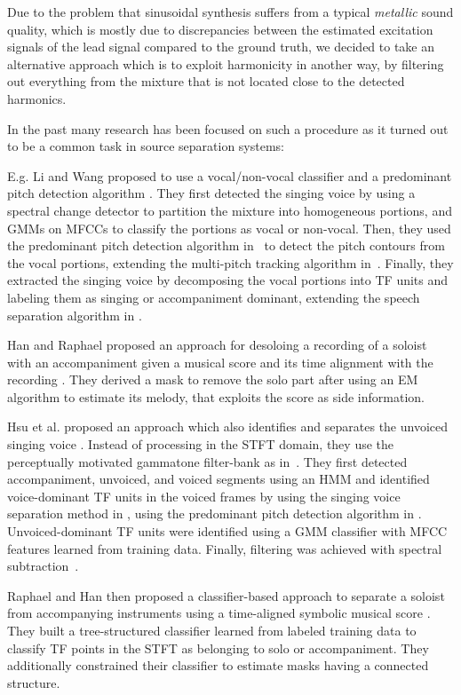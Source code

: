Due to the problem that sinusoidal synthesis suffers from a typical \textit{metallic} sound quality, which is mostly due to discrepancies between the estimated excitation signals of the lead signal compared to the ground truth, we decided to take an alternative approach which is to exploit harmonicity in another way, by filtering out everything from the mixture that is not located close to the detected harmonics.
\par
In the past many research has been focused on such a procedure as it turned out to be a common task in source separation systems:

E.g. Li and Wang proposed to use a vocal/non-vocal classifier and a predominant pitch detection algorithm \cite{li06,li07}. They first detected the singing voice by using a spectral change detector \cite{duxbury03} to partition the mixture into homogeneous portions, and GMMs on MFCCs to classify the portions as vocal or non-vocal. Then, they used the predominant pitch detection algorithm in~\cite{li05} to detect the pitch contours from the vocal portions, extending the multi-pitch tracking algorithm in~\cite{wu03}. Finally, they extracted the singing voice by decomposing the vocal portions into TF units and labeling them as singing or accompaniment dominant, extending the speech separation algorithm in \cite{hu02}.

Han and Raphael proposed an approach for desoloing a recording of a soloist with an accompaniment given a musical score and its time alignment with the recording \cite{han07}. They derived a mask \cite{roweis01} to remove the solo part after using an EM algorithm to estimate its melody, that exploits the score as side information.

Hsu et al. proposed an approach which also identifies and separates the unvoiced singing voice \cite{hsu08,hsu10}. Instead of processing in the STFT domain, they use the perceptually motivated gammatone filter-bank as in~\cite{hu02,li07}. They first detected accompaniment, unvoiced, and voiced segments using an HMM and identified voice-dominant TF units in the voiced frames by using the singing voice separation method in \cite{li07}, using the predominant pitch detection algorithm in \cite{dressler062}. Unvoiced-dominant TF units were identified using a GMM classifier with MFCC features learned from training data. Finally, filtering was achieved with spectral subtraction~\cite{scalart96}.

Raphael and Han then proposed a classifier-based approach to separate a soloist from accompanying instruments using a time-aligned symbolic musical score \cite{raphael08}. They built a tree-structured classifier \cite{breiman84} learned from labeled training data to classify TF points in the STFT as belonging to solo or accompaniment. They additionally constrained their classifier to estimate masks having a connected structure.

